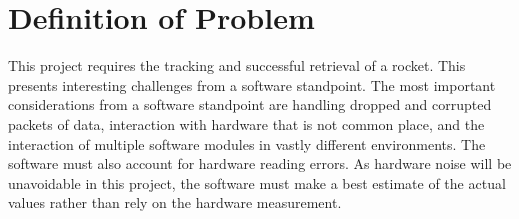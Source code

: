 \documentclass[onecolumn, draftclsnofoot,10pt, compsoc]{IEEEtran}
\begin{document}
\begin{titlepage}
\begin{singlespace}
\begin{abstract}
        \end{abstract}     
    \end{singlespace}
\end{titlepage}
\newpage
{}
\tableofcontents
\clearpage

\section{Definition of Problem}
This project requires the tracking and successful retrieval of a rocket. This presents interesting challenges from a software standpoint. The most important considerations from a software standpoint are handling dropped and corrupted packets of data, interaction with hardware that is not common place, and the interaction of multiple software modules in vastly different environments. The software must also account for hardware reading errors. As hardware noise will be unavoidable in this project, the software must make a best estimate of the actual values rather than rely on the hardware measurement.\par
\end{document}
